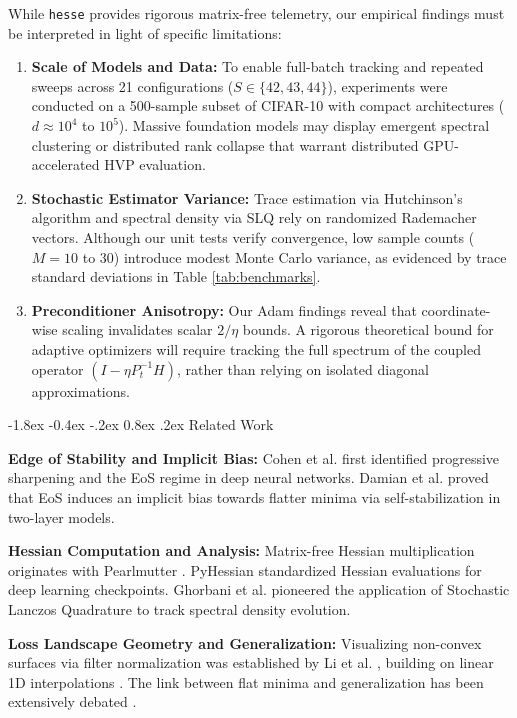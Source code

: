 \documentclass[10pt,twocolumn]{article}
\makeatletter
\renewcommand\section{\@startsection {section}{1}{\z@}%
                                   {-1.8ex \@plus -0.4ex \@minus -.2ex}%
                                   {0.8ex \@plus .2ex}%
                                   {\normalfont\large\bfseries}}
\makeatother
\begin{document}
While \texttt{hesse} provides rigorous matrix-free telemetry, our empirical findings must be interpreted in light of specific limitations:
\begin{enumerate}
    \item \textbf{Scale of Models and Data:} To enable full-batch tracking and repeated sweeps across 21 configurations ($S \in \{42, 43, 44\}$), experiments were conducted on a 500-sample subset of CIFAR-10 with compact architectures ($d \approx 10^4$ to $10^5$). Massive foundation models may display emergent spectral clustering or distributed rank collapse that warrant distributed GPU-accelerated HVP evaluation.
    \item \textbf{Stochastic Estimator Variance:} Trace estimation via Hutchinson's algorithm and spectral density via SLQ rely on randomized Rademacher vectors. Although our unit tests verify convergence, low sample counts ($M=10$ to $30$) introduce modest Monte Carlo variance, as evidenced by trace standard deviations in Table \ref{tab:benchmarks}.
    \item \textbf{Preconditioner Anisotropy:} Our Adam findings reveal that coordinate-wise scaling invalidates scalar $2/\eta$ bounds. A rigorous theoretical bound for adaptive optimizers will require tracking the full spectrum of the coupled operator $(I - \eta P_t^{-1} H)$, rather than relying on isolated diagonal approximations.
\end{enumerate}

\section{Related Work}

\textbf{Edge of Stability and Implicit Bias:} Cohen et al. \cite{cohen2021gradient, cohen2022adaptive} first identified progressive sharpening and the EoS regime in deep neural networks. Damian et al. \cite{damian2023self} proved that EoS induces an implicit bias towards flatter minima via self-stabilization in two-layer models.

\textbf{Hessian Computation and Analysis:} Matrix-free Hessian multiplication originates with Pearlmutter \cite{pearlmutter1994fast}. PyHessian \cite{yao2020pyhessian} standardized Hessian evaluations for deep learning checkpoints. Ghorbani et al. \cite{ghorbani2019investigation} pioneered the application of Stochastic Lanczos Quadrature to track spectral density evolution.

\textbf{Loss Landscape Geometry and Generalization:} Visualizing non-convex surfaces via filter normalization was established by Li et al. \cite{li2018visualizing}, building on linear 1D interpolations \cite{goodfellow2015qualitatively}. The link between flat minima and generalization has been extensively debated \cite{keskar2017large, dinh2017sharp}.
\end{document}
